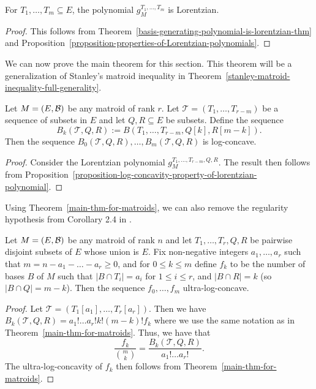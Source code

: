 \documentclass{puthesis-UG}
\begin{document}
\begin{lem}
	For $T_1, \ldots, T_m \subseteq E$, the polynomial $g_M^{T_1, \ldots, T_m}$ is Lorentzian. 
\end{lem}
\begin{proof}
	This follows from Theorem~\ref{basis-generating-polynomial-is-lorentzian-thm} and Proposition~\ref{proposition-properties-of-Lorentzian-polynomials}. 
\end{proof}

We can now prove the main theorem for this section. This theorem will be a generalization of Stanley's matroid inequality in Theorem~\ref{stanley-matroid-inequality-full-generality}. 

\begin{thm} \label{main-thm-for-matroids}
	Let $M = (E, \mathcal{B})$ be any matroid of rank $r$. Let $\mathcal{T} = (T_1, \ldots, T_{r-m})$ be a sequence of subsets in $E$ and let $Q, R \subseteq E$ be subsets. Define the sequence
	\[	
		B_k(\mathcal{T}, Q, R) := B(T_1, \ldots, T_{r-m}, Q[k], R [m-k]).
	\]
	Then the sequence $B_0(\mathcal{T}, Q, R), \ldots, B_m(\mathcal{T}, Q, R)$ is log-concave. 
\end{thm}

\begin{proof}
	Consider the Lorentzian polynomial $g_M^{T_1, \ldots, T_{r-m}, Q, R}$. The result then follows from Proposition~\ref{proposition-log-concavity-property-of-lorentzian-polynomial}. 
\end{proof}

Using Theorem~\ref{main-thm-for-matroids}, we can also remove the regularity hypothesis from Corollary 2.4 in \cite{STANLEY}. 

\begin{cor} \label{cor-ultra-log-concavity-of-some-sequence-related-to-bases}
	Let $M = (E, \mathcal{B})$ be any matroid of rank $n$ and let $T_1, \ldots, T_r, Q, R$ be pairwise disjoint subsets of $E$ whose union is $E$. Fix non-negative integers $a_1, \ldots, a_r$ such that $m = n - a_1 - \ldots - a_r \geq 0$, and for $0 \leq k \leq m$ define $f_k$ to be the number of bases $B$ of $M$ such that $|B \cap T_i| = a_i$ for $1 \leq i \leq r$, and $|B \cap R| = k$ (so $|B \cap Q| = m-k$). Then the sequence $f_0, \ldots, f_m$ ultra-log-concave. 
\end{cor}
	
\begin{proof}
	Let $\mathcal{T} = (T_1[a_1], \ldots, T_r[a_r])$. Then we have $B_k(\mathcal{T}, Q, R) = a_1! \ldots a_r! k! (m-k)! f_k$ where we use the same notation as in Theorem~\ref{main-thm-for-matroids}. Thus, we have that
	\[	
		\frac{f_k}{\binom{m}{k}} = \frac{B_k(\mathcal{T}, Q, R)}{a_1 ! \ldots a_r!}.
	\]
	The ultra-log-concavity of $f_k$ then follows from Theorem~\ref{main-thm-for-matroids}. 
\end{proof}
\end{document}
